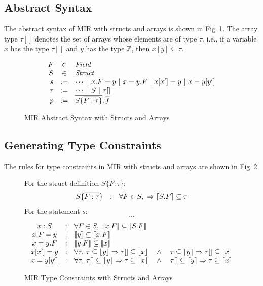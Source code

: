 \documentclass[peerreview, 10pt]{IEEEtran}
\newcommand{\Z}{\ensuremath{\mathbb{Z}}}
\newcommand{\cons}[1]{\ensuremath{\llbracket#1\rrbracket}}
\newcommand{\floor}[1]{\ensuremath{\lfloor#1\rfloor}}
\newcommand{\ceil}[1]{\ensuremath{\lceil#1\rceil}}
\newcommand{\ifrule}[2]{\ensuremath{#1&:&#2}}
\begin{document}
\subsection{Abstract Syntax}
The abstract syntax of MIR with structs and arrays is shown in Fig~\ref{fig:mir-structs-arrays-absyn}. The array type $\tau[]$ denotes the set of arrays whose elements are of type $\tau$. i.e., if a variable $x$ has the type $\tau[]$ and $y$ has the type $\Z$, then $x[y]\subseteq\tau$.
\begin{figure}[ht]
\centering
\begin{framed}
\[
  \begin{array}{@{}rcl@{}}
    F &\in& \mathit{Field} \\
    S &\in& \mathit{Struct} \\
    s &:=& \cdots\ |\ x.F=y\ |\ x=y.F\ |\ x[x']=y\ |\ x=y[y'] \\
    \tau &:=& \cdots\ |\ S\ |\ \tau[] \\
    p &:=& \overline{S \{ \overline{F:\tau} \}}; \overline{f} \\
  \end{array}
\]
\end{framed}
\caption{MIR Abstract Syntax with Structs and Arrays}
\label{fig:mir-structs-arrays-absyn}
\end{figure}

\subsection {Generating Type Constraints}

The rules for type constraints in MIR with structs and arrays are shown in Fig~\ref{fig:mir-structs-arrays-type-constraints}.

\begin{figure}[ht]
\begin{framed}
For the struct definition $S \{ \overline{F:\tau} \}$:
\[
\begin{array}{@{}ccl@{}}
  \ifrule{S \{ \overline{F:\tau} \}}{\forall F\in S,\ \Rightarrow \ceil{S.F} \subseteq \tau}
\end{array}
\]
For the statement $s$:
\[\cdots\]
\[
\begin{array}{@{}ccl@{}}
  \ifrule{x:S}{\forall F\in S,\ \cons{x.F}\subseteq\cons{S.F}}\\
  \ifrule{x.F=y}{\cons{y} \subseteq \cons{x.F}}\\
  \ifrule{x=y.F}{\cons{y.F} \subseteq \cons{x}}\\
  \ifrule{x[x']=y}{\forall\tau,\,\tau\subseteq\floor{y}\Rightarrow\tau[]\subseteq\floor{x}\quad\land\quad\tau\subseteq\ceil{y}\Rightarrow\tau[]\subseteq\ceil{x}}\\
  \ifrule{x=y[y']}{\forall\tau,\,\tau[]\subseteq\floor{y}\Rightarrow\tau\subseteq\floor{x}\quad\land\quad\tau[]\subseteq\ceil{y}\Rightarrow\tau\subseteq\ceil{x}}
\end{array}
\]
\end{framed}
\caption{MIR Type Constraints with Structs and Arrays}
\label{fig:mir-structs-arrays-type-constraints}
\end{figure}
\end{document}
